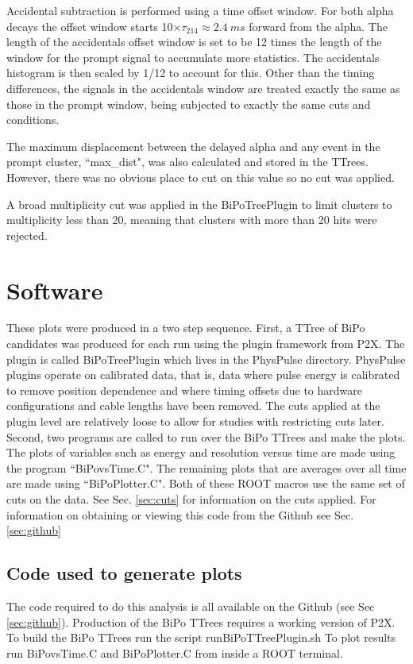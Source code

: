 Accidental subtraction is performed using a time offset window. For both alpha decays the offset window starts 10$\times\tau_{214}\approx2.4~ms$ forward from the alpha. The length of the accidentals offset window is set to be 12 times the length of the window for the prompt signal to accumulate more statistics. The accidentals histogram is then scaled by 1/12 to account for this. Other than the timing differences, the signals in the accidentals window are treated exactly the same as those in the prompt window, being subjected to exactly the same cuts and conditions.

The maximum displacement between the delayed alpha and any event in the prompt cluster, ``max\_dist", was also calculated and stored in the TTrees. However, there was no obvious place to cut on this value so no cut was applied. 

A broad multiplicity cut was applied in the BiPoTreePlugin to limit clusters to multiplicity less than 20, meaning that clusters with more than 20 hits were rejected.

\section{Software}
These plots were produced in a two step sequence. First, a TTree of BiPo candidates was produced for each run using the plugin framework from P2X. The plugin is called BiPoTreePlugin which lives in the PhysPulse directory. PhysPulse plugins operate on calibrated data, that is, data where pulse energy is calibrated to remove position dependence and where timing offsets due to hardware configurations and cable lengths have been removed. The cuts applied at the plugin level are relatively loose to allow for studies with restricting cuts later. Second, two programs are called to run over the BiPo TTrees and make the plots. The plots of variables such as energy and resolution versus time are made using the program ``BiPovsTime.C". The remaining plots that are averages over all time are made using ``BiPoPlotter.C".  Both of these ROOT macros use the same set of cuts on the data. See Sec. \ref{sec:cuts} for information on the cuts applied. For information on obtaining or viewing this code from the Github see Sec. \ref{sec:github} 
\subsection{Code used to generate plots}
The code required to do this analysis is all available on the Github (see Sec \ref{sec:github}). Production of the BiPo TTrees requires a working version of P2X. 
To build the BiPo TTrees run the script runBiPoTTreePlugin.sh
To plot results run BiPovsTime.C and BiPoPlotter.C from inside a ROOT terminal. 
